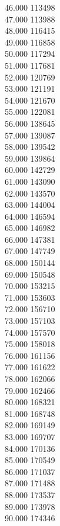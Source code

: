 { 46.000	113498 \\
 47.000	113988 \\
 48.000	116415 \\
 49.000	116858 \\
 50.000	117294 \\
 51.000	117681 \\
 52.000	120769 \\
 53.000	121191 \\
 54.000	121670 \\
 55.000	122081 \\
 56.000	138645 \\
 57.000	139087 \\
 58.000	139542 \\
 59.000	139864 \\
 60.000	142729 \\
 61.000	143090 \\
 62.000	143570 \\
 63.000	144004 \\
 64.000	146594 \\
 65.000	146982 \\
 66.000	147381 \\
 67.000	147749 \\
 68.000	150144 \\
 69.000	150548 \\
 70.000	153215 \\
 71.000	153603 \\
 72.000	156710 \\
 73.000	157103 \\
 74.000	157570 \\
 75.000	158018 \\
 76.000	161156 \\
 77.000	161622 \\
 78.000	162066 \\
 79.000	162466 \\
 80.000	168321 \\
 81.000	168748 \\
 82.000	169149 \\
 83.000	169707 \\
 84.000	170136 \\
 85.000	170549 \\
 86.000	171037 \\
 87.000	171488 \\
 88.000	173537 \\
 89.000	173978 \\
 90.000	174346 \\
}
